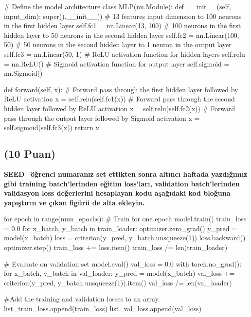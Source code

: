 \documentclass[11pt]{article}
\begin{document}
\begin{python}
# Define the model architecture
class MLP(nn.Module):
    def __init__(self, input_dim):
        super().__init__()
        # 13 features input dimension to 100 neurons in the first hidden layer
        self.fc1 = nn.Linear(13, 100)
        # 100 neurons in the first hidden layer to 50 neurons in the second hidden layer
        self.fc2 = nn.Linear(100, 50)
        # 50 neurons in the second hidden layer to 1 neuron in the output layer
        self.fc3 = nn.Linear(50, 1)
        # ReLU activation function for hidden layers
        self.relu = nn.ReLU()
        # Sigmoid activation function for output layer
        self.sigmoid = nn.Sigmoid()

    def forward(self, x):
        # Forward pass through the first hidden layer followed by ReLU activation
        x = self.relu(self.fc1(x))
        # Forward pass through the second hidden layer followed by ReLU activation
        x = self.relu(self.fc2(x))
        # Forward pass through the output layer followed by Sigmoid activation
        x = self.sigmoid(self.fc3(x))
        return x
\end{python}

\subsection{(10 Puan)} \textbf{SEED=öğrenci numaranız set ettikten sonra altıncı haftada yazdığımız gibi training batch'lerinden eğitim loss'ları, validation batch'lerinden validasyon loss değerlerini hesaplayan kodu aşağıdaki kod bloğuna yapıştırın ve çıkan figürü de alta ekleyin.}

\begin{python}
    for epoch in range(num_epochs):
        # Train for one epoch
        model.train()
        train_loss = 0.0
        for x_batch, y_batch in train_loader:
            optimizer.zero_grad()
            y_pred = model(x_batch)
            loss = criterion(y_pred, y_batch.unsqueeze(1))
            loss.backward()
            optimizer.step()
            train_loss += loss.item()
        train_loss /= len(train_loader)

        # Evaluate on validation set
        model.eval()
        val_loss = 0.0
        with torch.no_grad():
            for x_batch, y_batch in val_loader:
                y_pred = model(x_batch)
                val_loss += criterion(y_pred, y_batch.unsqueeze(1)).item()
            val_loss /= len(val_loader)
        
        #Add the training and validation losses to an array.
        list_train_loss.append(train_loss)
        list_val_loss.append(val_loss)
\end{python}
\end{document}

